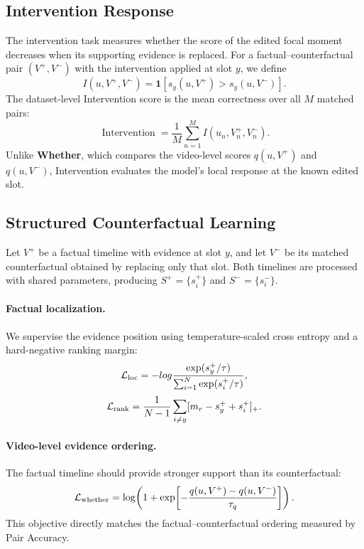 \subsection{Intervention Response}

The intervention task measures whether the score of the edited focal moment decreases when its supporting evidence is replaced. For a factual--counterfactual pair $(V^+,V^-)$ with the intervention applied at slot $y$, we define
\begin{equation}
I(u,V^+,V^-)
=\mathbf{1}\!\left[s_y(u,V^+)>s_y(u,V^-)\right].
\label{eq:intervention-correct}
\end{equation}
The dataset-level Intervention score is the mean correctness over all $M$ matched pairs:
\begin{equation}
\operatorname{Intervention}
=\frac{1}{M}\sum_{n=1}^{M}
I(u_n,V_n^+,V_n^-).
\label{eq:intervention-metric}
\end{equation}
Unlike \textbf{Whether}, which compares the video-level scores $q(u,V^+)$ and $q(u,V^-)$, Intervention evaluates the model's local response at the known edited slot.

\subsection{Structured Counterfactual Learning}

Let $V^+$ be a factual timeline with evidence at slot $y$, and let $V^-$ be its matched counterfactual obtained by replacing only that slot. Both timelines are processed with shared parameters, producing $S^+=\{s_i^+\}$ and $S^-=\{s_i^-\}$.

\paragraph{Factual localization.}
We supervise the evidence position using temperature-scaled cross entropy and a hard-negative ranking margin:
\begin{equation}
\mathcal L_{\rm loc}
=-log\frac{\exp(s_y^+/\tau)}{\sum_{i=1}^{N}\exp(s_i^+/\tau)},
\end{equation}
\begin{equation}
\mathcal L_{\rm rank}
=\frac{1}{N-1}\sum_{i\neq y}[m_r-s_y^++s_i^+]_+.
\end{equation}

\paragraph{Video-level evidence ordering.}
The factual timeline should provide stronger support than its counterfactual:
\begin{equation}
\mathcal L_{\rm whether}
=\log\!\left(1+\exp\!\left[-\frac{q(u,V^+)-q(u,V^-)}{\tau_q}\right]\right).
\label{eq:whether-loss}
\end{equation}
This objective directly matches the factual--counterfactual ordering measured by Pair Accuracy.

